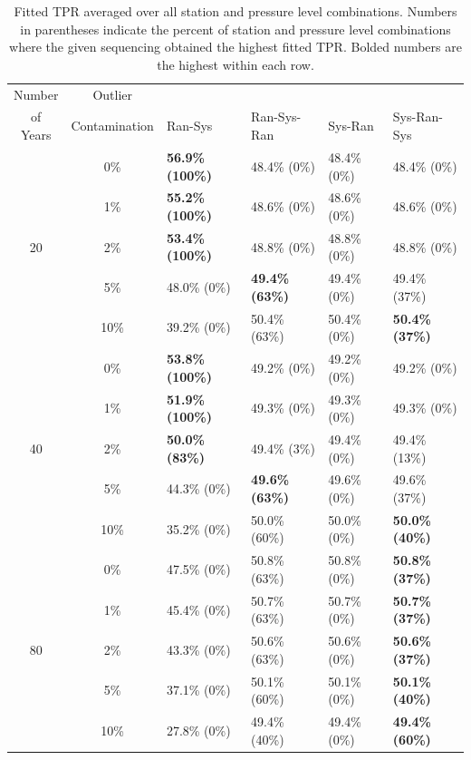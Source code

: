 \documentclass[12pt]{article}
\begin{document}
\begin{landscape}
\begin{table}[ht]
	\centering
	\begin{tabular}{cc|llll}
  		\hline
		Number & Outlier & & & &\\ 
		of Years & Contamination & Ran-Sys & Ran-Sys-Ran & Sys-Ran & Sys-Ran-Sys\\ 
 		\hline
		 & 0\% & \textbf{56.9\% (100\%)} & 48.4\% (0\%) & 48.4\% (0\%) & 48.4\% (0\%) \\ 
		 & 1\% & \textbf{55.2\% (100\%)} & 48.6\% (0\%) & 48.6\% (0\%) & 48.6\% (0\%) \\ 
		20 & 2\% & \textbf{53.4\% (100\%)} & 48.8\% (0\%) & 48.8\% (0\%) & 48.8\% (0\%) \\ 
		 & 5\% & 48.0\% (0\%) & \textbf{49.4\% (63\%)} & 49.4\% (0\%) & 49.4\% (37\%) \\ 
		 & 10\% & 39.2\% (0\%) & 50.4\% (63\%) & 50.4\% (0\%) & \textbf{50.4\% (37\%)} \\ 
		\hline
		 & 0\% & \textbf{53.8\% (100\%)} & 49.2\% (0\%) & 49.2\% (0\%) & 49.2\% (0\%) \\ 
		 & 1\% & \textbf{51.9\% (100\%)} & 49.3\% (0\%) & 49.3\% (0\%) & 49.3\% (0\%) \\ 
		40 & 2\% & \textbf{50.0\% (83\%)} & 49.4\% (3\%) & 49.4\% (0\%) & 49.4\% (13\%) \\ 
		 & 5\% & 44.3\% (0\%) & \textbf{49.6\% (63\%)} & 49.6\% (0\%) & 49.6\% (37\%) \\ 
		 & 10\% & 35.2\% (0\%) & 50.0\% (60\%) & 50.0\% (0\%) & \textbf{50.0\% (40\%)} \\ 
		\hline
		 & 0\% & 47.5\% (0\%) & 50.8\% (63\%) & 50.8\% (0\%) & \textbf{50.8\% (37\%)} \\ 
		 & 1\% & 45.4\% (0\%) & 50.7\% (63\%) & 50.7\% (0\%) & \textbf{50.7\% (37\%)} \\ 
		80 & 2\% & 43.3\% (0\%) & 50.6\% (63\%) & 50.6\% (0\%) & \textbf{50.6\% (37\%)} \\ 
		 & 5\% & 37.1\% (0\%) & 50.1\% (60\%) & 50.1\% (0\%) & \textbf{50.1\% (40\%)} \\ 
		 & 10\% & 27.8\% (0\%) & 49.4\% (40\%) & 49.4\% (0\%) & \textbf{49.4\% (60\%)} \\ 
		\hline
	\end{tabular}
	\caption{Fitted TPR averaged over all station and pressure level combinations.  Numbers in parentheses indicate the percent of station and pressure level combinations where the given sequencing obtained the highest fitted TPR. Bolded numbers are the highest within each row.}
	\label{tab:fitTPR}
\end{table}
\end{landscape}
\end{document}

